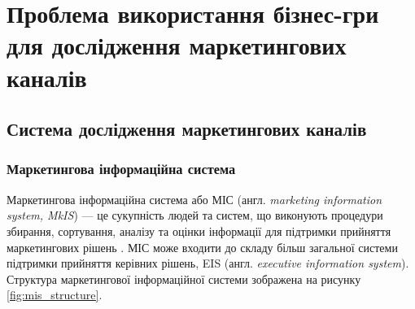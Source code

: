 ﻿\section{Проблема використання бізнес-гри для дослідження маркетингових каналів}
    \subsection{Система дослідження маркетингових каналів}
        \subsubsection{Маркетингова інформаційна система}
Маркетингова інформаційна система або МІС (англ. {\it marketing information system, MkIS}) --- це сукупність людей та систем, що виконують процедури збирання, сортування, аналізу та оцінки інформації для підтримки прийняття маркетингових рішень \cite{kotler14}. МІС може входити до складу більш загальної системи підтримки прийняття керівних рішень, EIS (англ. {\it executive information system}). Структура маркетингової інформаційної системи зображена на рисунку \ref{fig:mis_structure}.
        
